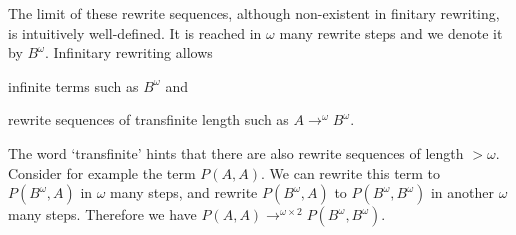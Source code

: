 The limit of these rewrite sequences, although non-existent in
finitary rewriting, is intuitively well-defined. It is reached in
$\omega$ many rewrite steps and we denote it by $B^\omega$. Infinitary
rewriting allows \begin{inparaenum}[(i)]
  \item infinite terms such as $B^\omega$ and
  \item rewrite sequences of transfinite length such as $A
    \rightarrow^\omega B^\omega$.
\end{inparaenum}\nopagebreak[3]
\begin{center}
{\footnotesize{}}
\end{center}\vspace{-0.8\baselineskip}
The word `transfinite' hints that there are also rewrite sequences of
length $> \omega$. Consider for example the term $P(A, A)$. We can
rewrite this term to $P(B^\omega, A)$ in $\omega$ many steps, and
rewrite $P(B^\omega, A)$ to $P(B^\omega, B^\omega)$ in another
$\omega$ many steps. Therefore we have $P(A, A) \rightarrow^{\omega
  \times 2} P(B^\omega, B^\omega)$.

